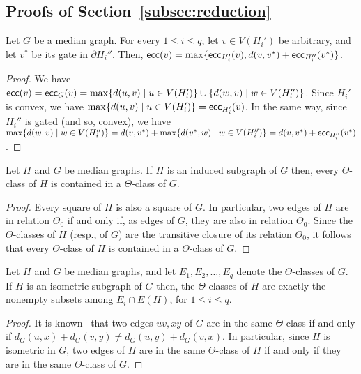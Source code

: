 \documentclass[a4paper,UKenglish,numberwithinsect,cleveref, autoref]{lipics-v2021}
\newcommand{\ecc}{\mbox{\textsf{ecc}}}
\begin{document}
\subsection{Proofs of Section~\ref{subsec:reduction}} \label{asubsec:reduction}

\begin{lemma}\label{lem:guigui-1}
Let $G$ be a median graph.
For every $1 \leq i \leq q$, let $v \in V(H_i')$ be arbitrary, and let $v^*$ be its gate in $\partial H_i''$.
Then, $\ecc(v) = \max\{\ecc_{H_i'}(v), d(v,v^*) + \ecc_{H_i''}(v^*)\}$.
\end{lemma}
\begin{proof}
We have $\ecc(v) = \ecc_G(v) = \max\{d(u,v) \mid u \in V(H_i')\} \cup \{d(w,v) \mid w \in V(H_i'')\}$.
Since $H_i'$ is convex, we have $\max\{d(u,v) \mid u \in V(H_i')\} = \ecc_{H_i'}(v)$.
In the same way, since $H_i''$ is gated (and so, convex), we have $\max\{d(w,v) \mid w \in V(H_i'')\} = d(v,v^*) + \max\{d(v^*,w) \mid w \in V(H_i'')\} = d(v,v^*) + \ecc_{H_i''}(v^*)$.
\end{proof}

\begin{lemma}\label{lem:guigui-2}
Let $H$ and $G$ be median graphs.
If $H$ is an induced subgraph of $G$ then, every $\Theta$-class of $H$ is contained in a $\Theta$-class of $G$.
\end{lemma}
\begin{proof}
Every square of $H$ is also a square of $G$.
In particular, two edges of $H$ are in relation $\Theta_0$ if and only if, as edges of $G$, they are also in relation $\Theta_0$.
Since the $\Theta$-classes of $H$ (resp., of $G$) are the transitive closure of its relation $\Theta_0$, it follows that every $\Theta$-class of $H$ is contained in a $\Theta$-class of $G$.
\end{proof}

\begin{lemma}\label{lem:guigui-2bis}
Let $H$ and $G$ be median graphs, and let $E_1,E_2,\ldots,E_q$ denote the $\Theta$-classes of $G$.
If $H$ is an isometric subgraph of $G$ then, the $\Theta$-classes of $H$ are exactly the nonempty subsets among $E_i \cap E(H)$, for $1 \leq i \leq q$.
\end{lemma}
\begin{proof}
It is known~\cite{winkler1984isometric} that two edges $uv,xy$ of $G$ are in the same $\Theta$-class if and only if $d_G(u,x) + d_G(v,y) \neq d_G(u,y) + d_G(v,x)$.
In particular, since $H$ is isometric in $G$, two edges of $H$ are in the same $\Theta$-class of $H$ if and only if they are in the same $\Theta$-class of $G$.
\end{proof}
\end{document}
